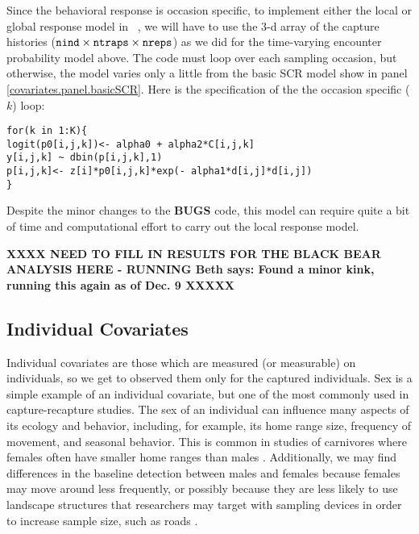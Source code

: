 Since the behavioral response is occasion specific, to implement either the local or global 
response model in \jags~, we will have to use the 3-d array of the
capture histories ($\mbox{\tt nind} \times \mbox{\tt ntraps} \times
\mbox{\tt nreps}$) as we did for the time-varying encounter probability
model above. The code must loop over each sampling occasion, but otherwise, the model
varies only a little from the basic SCR model show in panel \ref{covariates.panel.basicSCR}.  
Here is the specification of the the occasion specific ($k$) loop:

{\small
\begin{verbatim}
for(k in 1:K){
logit(p0[i,j,k])<- alpha0 + alpha2*C[i,j,k]
y[i,j,k] ~ dbin(p[i,j,k],1)
p[i,j,k]<- z[i]*p0[i,j,k]*exp(- alpha1*d[i,j]*d[i,j])
}
\end{verbatim}
}

Despite the minor changes to the {\bf BUGS} code, this model can require quite a bit of time and computational 
effort to carry out the local response model.  

{\bf XXXX NEED TO FILL IN RESULTS FOR THE BLACK BEAR ANALYSIS HERE -
  RUNNING 
Beth says: Found a minor kink, running this again as of Dec. 9
XXXXX }


\subsection{Individual Covariates}
\label{covariates.sec.sex}


Individual covariates are those which are measured (or measurable) on
individuals, so we get to observed them only for the captured
individuals. Sex is a simple example of an individual covariate, but
one of the most commonly used in capture-recapture studies. 
The sex of an individual can influence many aspects of its ecology and
behavior, including, for example, its home range size, frequency of
movement, and seasonal behavior. This is common in studies of
carnivores where females often have smaller home ranges than males
\citep{gardner_etal:2010jwm, sollmann_etal:2011}. Additionally, we may
find differences in the baseline detection between males and females
because females may move around less frequently, or possibly because
they are less likely to use landscape structures that researchers may
target with sampling devices in order to increase sample size, such as
roads \citep[e.g.][]{salom-perez_etal:2007}.

